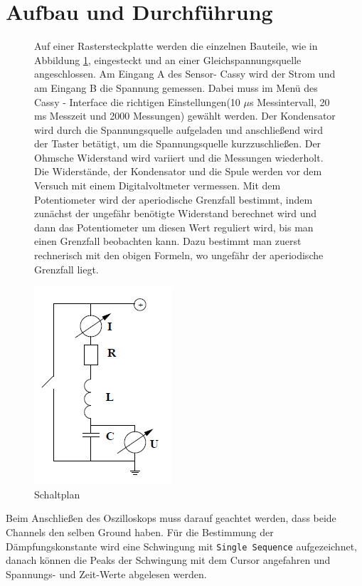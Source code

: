 \documentclass[a4paper, 11pt]{article}
\begin{document}
\section{Aufbau und Durchführung}
\begin{figure}[H]
	\begin{minipage}{0.6\textwidth}
	Auf einer Rastersteckplatte werden die einzelnen Bauteile, wie in Abbildung \ref{Schaltplan}, eingesteckt und an einer Gleichspannungsquelle angeschlossen. Am Eingang A des Sensor- Cassy wird der Strom und am Eingang B die Spannung gemessen. Dabei muss im Menü des Cassy - Interface die richtigen Einstellungen(10 $\mu$s Messintervall, 20 ms Messzeit und 2000 Messungen) gewählt werden.	Der Kondensator wird durch die Spannungsquelle aufgeladen und anschließend wird der Taster betätigt, um die Spannungsquelle kurzzuschließen.  Der Ohmsche Widerstand wird variiert und die Messungen wiederholt. Die Widerstände, der Kondensator und die Spule werden vor dem Versuch mit einem Digitalvoltmeter vermessen. Mit dem Potentiometer wird der aperiodische Grenzfall bestimmt, indem zunächst der ungefähr benötigte Widerstand berechnet wird und dann das Potentiometer um diesen Wert reguliert wird, bis man einen Grenzfall beobachten kann. Dazu bestimmt man zuerst rechnerisch mit den obigen Formeln, wo ungefähr der aperiodische Grenzfall liegt.
	\end{minipage}
 	\hfill
	\begin{minipage}{0.3\textwidth}
	\includegraphics[scale=1]{Schaltplan.png}
	\caption{Schaltplan}
	\label{Schaltplan}
	\end{minipage}
\end{figure}

Beim Anschließen des Oszilloskops muss darauf geachtet werden, dass beide Channels den selben Ground haben. Für die Bestimmung der Dämpfungskonstante wird eine Schwingung mit \texttt{Single Sequence} aufgezeichnet, danach können die Peaks der Schwingung mit dem Cursor angefahren und Spannungs- und Zeit-Werte abgelesen werden.
\end{document}
